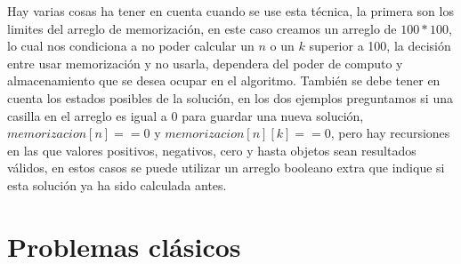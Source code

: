 Hay varias cosas ha tener en cuenta cuando se use esta técnica, la primera son los limites del arreglo de memorización, en este caso creamos un arreglo de $100*100$, lo cual nos condiciona a no poder calcular un $n$ o un $k$ superior a 100, la decisión entre usar memorización y no usarla, dependera del poder de computo y almacenamiento que se desea ocupar en el algoritmo. También se debe tener en cuenta los estados posibles de la solución, en los dos ejemplos preguntamos si una casilla en el arreglo es igual a 0 para guardar una nueva solución,$memorizacion[n] == 0$ y $memorizacion[n][k] == 0$, pero hay recursiones en las que valores positivos, negativos, cero y hasta objetos sean resultados válidos, en estos casos se puede utilizar un arreglo booleano extra que indique si esta solución ya ha sido calculada antes.

\section{Problemas clásicos}

